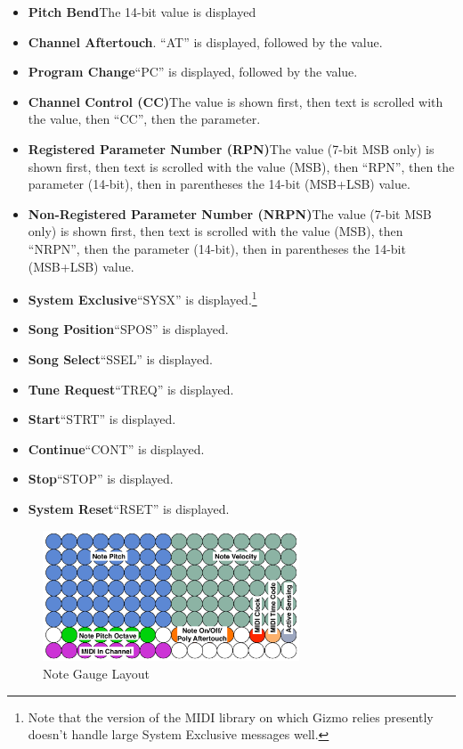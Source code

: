 \documentclass{article}
\begin{document}
\begin{itemize}
\item {\bf Pitch Bend}\quad The 14-bit value is displayed
\item {\bf Channel Aftertouch}.  ``AT'' is displayed, followed by the value.
\item {\bf Program Change}\quad ``PC'' is displayed, followed by the value.
\item {\bf Channel Control (CC)}\quad The value is shown first, then text is scrolled with the value, then ``CC'', then the parameter.
\item {\bf Registered Parameter Number (RPN)}\quad The value (7-bit MSB only) is shown first, then text is scrolled with the value (MSB), then ``RPN'', then the parameter (14-bit), then in parentheses the 14-bit (MSB+LSB) value.
\item {\bf Non-Registered Parameter Number (NRPN)}\quad The value (7-bit MSB only) is shown first, then text is scrolled with the value (MSB), then ``NRPN'', then the parameter (14-bit), then in parentheses the 14-bit (MSB+LSB) value.
\item {\bf System Exclusive}\quad ``SYSX'' is displayed.\footnote{Note that the version of the MIDI library on which Gizmo relies presently doesn't handle large System Exclusive messages well.}
\item {\bf Song Position}\quad ``SPOS'' is displayed.
\item {\bf Song Select}\quad ``SSEL'' is displayed.
\item {\bf Tune Request}\quad ``TREQ'' is displayed.
\item {\bf Start}\quad ``STRT'' is displayed.
\item {\bf Continue}\quad ``CONT'' is displayed.
\item {\bf Stop}\quad ``STOP'' is displayed.
\item {\bf System Reset}\quad ``RSET'' is displayed.
\end{itemize}



\begin{figure}
\vspace{-16em}\includegraphics[width=3in]{NoteGauge.pdf}
\vspace{-2em}\caption{\small Note Gauge Layout}\vspace{-1em}
\label{notegauge}
\end{figure}
\end{document}
